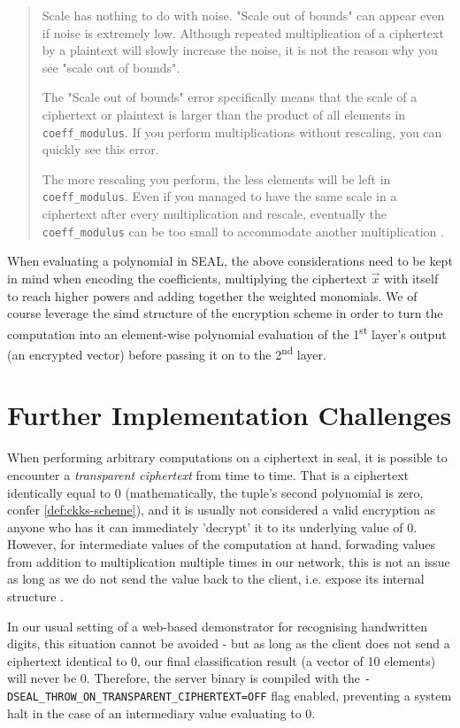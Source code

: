 \begin{quote}
  Scale has nothing to do with noise. "Scale out of bounds" can appear even if noise is extremely low. Although repeated multiplication of a ciphertext by a plaintext will slowly increase the noise, it is not the reason why you see "scale out of bounds".

  The "Scale out of bounds" error specifically means that the scale of a ciphertext or plaintext is larger than the product of all elements in \texttt{coeff\_modulus}. If you perform multiplications without rescaling, you can quickly see this error.

  The more rescaling you perform, the less elements will be left in \texttt{coeff\_modulus}. Even if you managed to have the same scale in a ciphertext after every multiplication and rescale, eventually the \texttt{coeff\_modulus} can be too small to accommodate another multiplication \parencite{2020-wei-github-comment}.
\end{quote}

When evaluating a polynomial in SEAL, the above considerations need to be kept in mind when encoding the coefficients, multiplying the ciphertext $\vec{x}$ with itself to reach higher powers and adding together the weighted monomials.
We of course leverage the \gls{simd} structure of the encryption scheme in order to turn the computation into an element-wise polynomial evaluation of the 1\textsuperscript{st} layer's output (an encrypted vector) before passing it on to the 2\textsuperscript{nd} layer.

\section{Further Implementation Challenges}
When performing arbitrary computations on a ciphertext in \gls{seal}, it is possible to encounter a \textit{transparent ciphertext} from time to time.
That is a ciphertext identically equal to 0 (mathematically, the tuple's second polynomial is zero, confer \cref{def:ckks-scheme}), and it is usually not considered a valid encryption as anyone who has it can immediately 'decrypt' it to its underlying value of 0.
However, for intermediate values of the computation at hand, forwading values from addition to multiplication multiple times in our network, this is not an issue as long as we do not send the value back to the client, i.e. expose its internal structure \parencite{kim-laine-on-transparent-ciphertexts}.

In our usual setting of a web-based demonstrator for recognising handwritten digits, this situation cannot be avoided - but as long as the client does not send a ciphertext identical to 0, our final classification result (a vector of 10 elements) will never be 0.
Therefore, the server binary is compiled with the \texttt{-DSEAL_THROW_ON_TRANSPARENT_CIPHERTEXT=OFF} flag enabled, preventing a system halt in the case of an intermediary value evaluating to 0.
